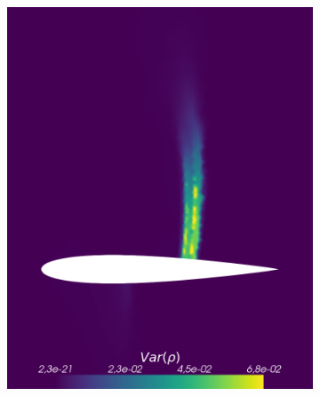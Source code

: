 \begin{figure}[h!]
\begin{subfigure}{0.3\linewidth}
		\label{fig:sub1}
	\end{subfigure}\\
	\vspace{-0.35cm}
	\begin{subfigure}{0.3\linewidth}
		\centering
		\includegraphics[scale=0.2]{figs/Euler1DPlots5/EulerSC5-2Res1e-6_VarRho.png}
		\label{fig:sub1}
	\end{subfigure}%
	\hfill
	\begin{subfigure}{0.3\linewidth}
		\centering

\end{subfigure}
\end{figure}
